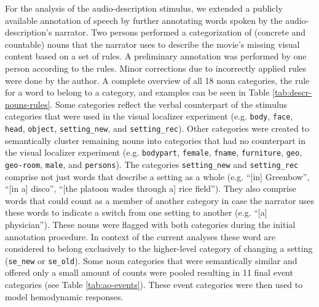 \documentclass[english]{article}
\begin{document}
For the analysis of the audio-description stimulus, we extended a publicly available annotation
of speech \citep{hausler2021studyforrest} by further annotating words spoken by
the audio-description's narrator.
Two persons performed a categorization of (concrete and countable) nouns that
the narrator uses to describe the movie's missing visual content based on a set
of rules.
A preliminary annotation was performed by one person according to the rules.
Minor corrections due to incorrectly applied rules were done by the author.
A complete overview of all 18 noun categories, the rule for a word to belong to
a category, and examples can be seen in Table \ref{tab:descr-nouns-rules}.
Some categories reflect the verbal counterpart of the stimulus categories that
were used in the visual localizer experiment (e.g. \texttt{body}, \texttt{face},
\texttt{head}, \texttt{object}, \texttt{setting\_new}, and
\texttt{setting\_rec}).
Other categories were created to semantically cluster remaining nouns into
categories that had no counterpart in the visual localizer experiment (e.g.
\texttt{bodypart}, \texttt{female}, \texttt{fname}, \texttt{furniture},
\texttt{geo}, \texttt{geo-room}, \texttt{male}, and \texttt{persons}).
The categories \texttt{setting\_new} and \texttt{setting\_rec} comprise not just
words that describe a setting as a whole (e.g. ``[in] Greenbow'', ``[in a]
disco'', ``[the platoon wades through a] rice field''). They also comprise words
that could count as a member of another category in case the narrator uses
these words to indicate a switch from one setting to another (e.g. ``[a]
physician'').
These nouns were flagged with both categories during the initial annotation
procedure. In context of the current analyses these word are considered to
belong exclusively to the higher-level category of changing a setting
(\texttt{se\_new} or \texttt{se\_old}).
Some noun categories that were semantically similar and offered only a small
amount of counts were pooled resulting in 11 final event categories (see Table
\ref{tab:ao-events}). These event categories were then used to model hemodynamic
responses.
\end{document}
